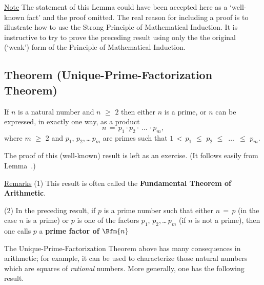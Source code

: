        \underline{Note} The statement of this Lemma could have been accepted here as a `well-known fact' and the proof omitted.
    The real reason for including a proof is to illustrate how to use the Strong Principle of Mathematical Induction.
    It is instructive to try to prove the preceding result using only the the original (`weak') form of the Principle of Mathematical Induction.

\V

            \subsection{\small{\bf Theorem} (Unique-Prime-Factorization Theorem)}
            \label{ThmA20.04D}

\V


        If $n$ is a natural number and $n\,\,{\geq}\,\,2$ then either $n$ is a prime, or $n$ can be expressed, in exactly one way, as a product
        \begin{displaymath}
        n \,=\, p_{1}{\cdot}p_{2}{\cdot}\,{\ldots}\,{\cdot}p_{m},
        \end{displaymath}
    where $m\,\,{\geq}\,\,2$ and $p_{1}$, $p_{2}$,\,{\ldots}\,$p_{m}$ are primes such that 
    $1\,<\,p_{1}\,\,{\leq}\,\,p_{2}\,\,{\leq}\,\,\,{\ldots}\,\,\,{\leq}\,\,p_{m}$.

\V

        The proof of this (well-known) result is left as an exercise. (It follows easily from Lemma~.)


\V

        \underline{Remarks} (1) This result is often called the {\bf Fundamental Theorem of Arithmetic}.

\V

        (2) In the preceding result, if $p$ is a prime number such that either $n \,=\, p$
    (in the case $n$ is a prime) or $p$ is one of the factors $p_{1}$, $p_{2}$,\,{\ldots}\,$p_{m}$ (if $n$ is not a prime),
    then one calls $p$ a {\bf prime factor of $\Bfm{n}$}



\VV

        The Unique-Prime-Factorization Theorem above has many consequences in arithmetic;
    for example, it can be used to characterize those natural numbers which are squares of {\em rational} numbers. More generally, one has the following result.

